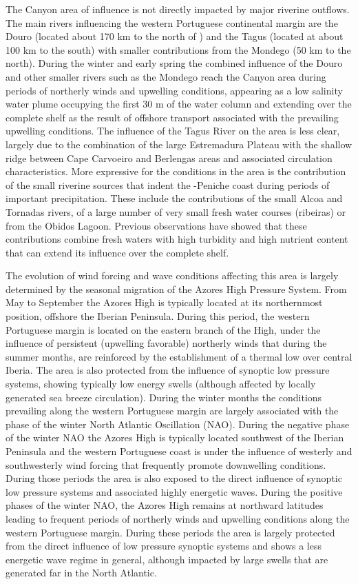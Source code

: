 The \naz Canyon area of influence is not directly impacted by major
riverine outflows. The main rivers influencing the western Portuguese
continental margin are the Douro (located about 170 km to the north of
\naze) and the Tagus (located at about 100 km to the south) with
smaller contributions from the Mondego (50 km to the north). During
the winter and early spring the combined influence of the Douro and
other smaller rivers such as the Mondego reach the \naz Canyon area
during periods of northerly winds and upwelling conditions, appearing
as a low salinity water plume occupying the first 30 m of the water
column and extending over the complete shelf as the result of offshore
transport associated with the prevailing upwelling conditions. The
influence of the Tagus River on the area is less clear, largely due to
the combination of the large Estremadura Plateau with the shallow
ridge between Cape Carvoeiro and Berlengas areas and associated
circulation characteristics. More expressive for the conditions in the
area is the contribution of the small riverine sources that indent the
\naze-Peniche coast during periods of important precipitation. These
include the contributions of the small Alcoa and Tornadas rivers, of a
large number of very small fresh water courses (ribeiras) or from the
Obidos Lagoon. Previous observations have showed \cite{martins10} that
these contributions combine fresh waters with high turbidity and high
nutrient content that can extend its influence over the complete
shelf.

The evolution of wind forcing and wave conditions affecting this area
is largely determined by the seasonal migration of the Azores High
Pressure System. From May to September the Azores High is typically
located at its northernmost position, offshore the Iberian
Peninsula. During this period, the western Portuguese margin is
located on the eastern branch of the High, under the influence of
persistent (upwelling favorable) northerly winds that during the
summer months, are reinforced by the establishment of a thermal low
over central Iberia. The area is also protected from the influence of
synoptic low pressure systems, showing typically low energy swells
(although affected by locally generated sea breeze
circulation). During the winter months the conditions prevailing along
the western Portuguese margin are largely associated with the phase of
the winter North Atlantic Oscillation (NAO). During the negative phase
of the winter NAO the Azores High is typically located southwest of
the Iberian Peninsula and the western Portuguese coast is under the
influence of westerly and southwesterly wind forcing that frequently
promote downwelling conditions. During those periods the area is also
exposed to the direct influence of synoptic low pressure systems and
associated highly energetic waves. During the positive phases of the
winter NAO, the Azores High remains at northward latitudes leading to
frequent periods of northerly winds and upwelling conditions along the
western Portuguese margin. During these periods the area is largely
protected from the direct influence of low pressure synoptic systems
and shows a less energetic wave regime in general, although impacted
by large swells that are generated far in the North Atlantic.

